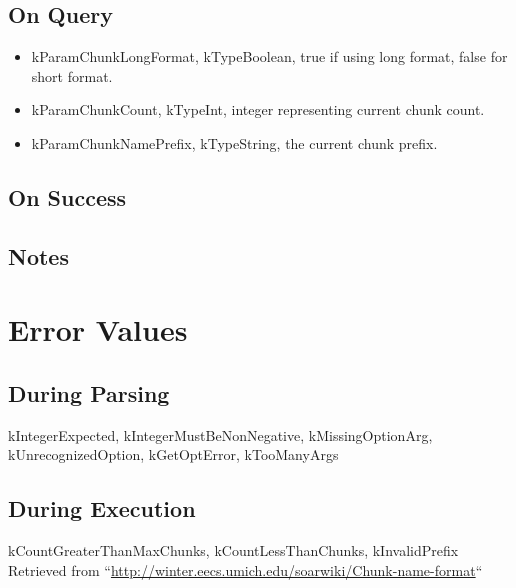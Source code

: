 \documentclass[10pt]{article}
\begin{document}
\subsection*{ On Query }
\begin{itemize}
\item  kParamChunkLongFormat, kTypeBoolean, true if using long format, false for short format. 
\item  kParamChunkCount, kTypeInt, integer representing current chunk count. 
\item  kParamChunkNamePrefix, kTypeString, the current chunk prefix. 

\end{itemize}
\subsection*{ On Success }
\subsection*{ Notes }
\section*{ Error Values }
\subsection*{ During Parsing }


 kIntegerExpected, kIntegerMustBeNonNegative, kMissingOptionArg, kUnrecognizedOption, kGetOptError, kTooManyArgs
\subsection*{ During Execution }


 kCountGreaterThanMaxChunks, kCountLessThanChunks, kInvalidPrefix Retrieved from ``\url{http://winter.eecs.umich.edu/soarwiki/Chunk-name-format}``
\end{document}
